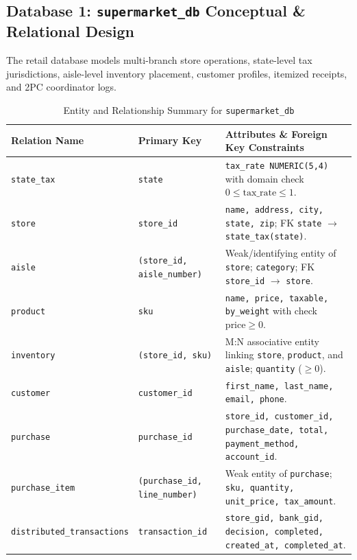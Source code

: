\documentclass[11pt, a4paper]{article}
\begin{document}
\subsection{Database 1: \texttt{supermarket\_db} Conceptual \& Relational Design}
The retail database models multi-branch store operations, state-level tax jurisdictions, aisle-level inventory placement, customer profiles, itemized receipts, and 2PC coordinator logs.

\begin{table}[htbp]
\centering
\caption{Entity and Relationship Summary for \texttt{supermarket\_db}}
\label{tab:supermarket_entities}
\begin{tabularx}{\textwidth}{l l X}
\toprule
\textbf{Relation Name} & \textbf{Primary Key} & \textbf{Attributes \& Foreign Key Constraints} \\
\midrule
\texttt{state\_tax} & \texttt{state} & \texttt{tax\_rate NUMERIC(5,4)} with domain check $0 \le \text{tax\_rate} \le 1$. \\
\texttt{store} & \texttt{store\_id} & \texttt{name, address, city, state, zip}; FK \texttt{state} $\rightarrow$ \texttt{state\_tax(state)}. \\
\texttt{aisle} & \texttt{(store\_id, aisle\_number)} & Weak/identifying entity of \texttt{store}; \texttt{category}; FK \texttt{store\_id} $\rightarrow$ \texttt{store}. \\
\texttt{product} & \texttt{sku} & \texttt{name, price, taxable, by\_weight} with check $\text{price} \ge 0$. \\
\texttt{inventory} & \texttt{(store\_id, sku)} & M:N associative entity linking \texttt{store}, \texttt{product}, and \texttt{aisle}; \texttt{quantity} ($\ge 0$). \\
\texttt{customer} & \texttt{customer\_id} & \texttt{first\_name, last\_name, email, phone}. \\
\texttt{purchase} & \texttt{purchase\_id} & \texttt{store\_id, customer\_id, purchase\_date, total, payment\_method, account\_id}. \\
\texttt{purchase\_item} & \texttt{(purchase\_id, line\_number)} & Weak entity of \texttt{purchase}; \texttt{sku, quantity, unit\_price, tax\_amount}. \\
\texttt{distributed\_transactions} & \texttt{transaction\_id} & \texttt{store\_gid, bank\_gid, decision, completed, created\_at, completed\_at}. \\
\bottomrule
\end{tabularx}
\end{table}
\end{document}
